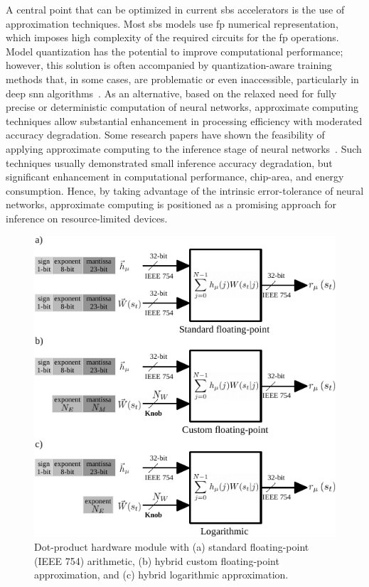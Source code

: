 A central point that can be optimized in current \gls{sbs} accelerators
is the use of approximation techniques.
Most \gls{sbs} models use \gls{fp}  numerical representation, which imposes high complexity of the required circuits for the \gls{fp} operations. Model quantization has the potential to improve computational performance; however, this solution is often accompanied by quantization-aware training methods that, in some cases, are problematic or even inaccessible, particularly in deep \gls{snn} algorithms~\cite{zhang2018survey}. 
As an alternative, based on the relaxed need for fully precise or deterministic computation of neural networks, approximate computing techniques allow substantial enhancement in processing efficiency with moderated accuracy degradation. Some research papers have shown the feasibility of applying approximate computing to the inference stage of neural networks~\cite{lotrivc2012applicability, sarwar2016multiplier, mrazek2016design, du2014leveraging}. Such techniques usually demonstrated small inference accuracy degradation, but significant enhancement in computational performance, chip-area, and energy consumption. Hence, by taking advantage of the intrinsic error-tolerance of neural networks, approximate computing is positioned as a promising approach for inference on resource-limited devices.

\begin{figure}[b!]
	\centering
	\includegraphics[width=0.5\columnwidth]{./chapters/sbs_accelerator/figures/dot-product_unit.pdf}
	\caption{Dot-product hardware module with (a) standard floating-point (IEEE 754) arithmetic, (b) hybrid custom floating-point approximation, and (c) hybrid logarithmic approximation.}
	\label{fig:dot_product_unit}
\end{figure}

